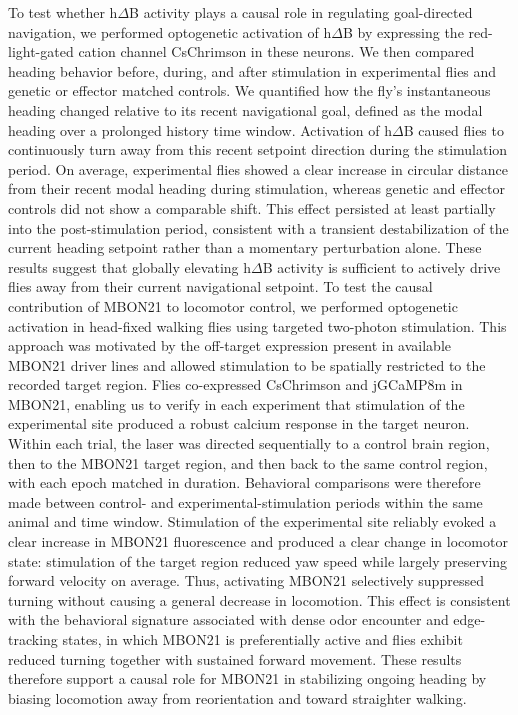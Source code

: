 To test whether h$\Delta$B activity plays a causal role in regulating goal-directed navigation, we performed optogenetic activation of h$\Delta$B by expressing the red-light-gated cation channel CsChrimson in these neurons. We then compared heading behavior before, during, and after stimulation in experimental flies and genetic or effector matched controls. We quantified how the fly’s instantaneous heading changed relative to its recent navigational goal, defined as the modal heading over a prolonged history time window.
Activation of h$\Delta$B caused flies to continuously turn away from this recent setpoint direction during the stimulation period. On average, experimental flies showed a clear increase in circular distance from their recent modal heading during stimulation, whereas genetic and effector controls did not show a comparable shift. This effect persisted at least partially into the post-stimulation period, consistent with a transient destabilization of the current heading setpoint rather than a momentary perturbation alone. These results suggest that globally elevating h$\Delta$B activity is sufficient to actively drive flies away from their current navigational setpoint. 
To test the causal contribution of MBON21 to locomotor control, we performed optogenetic activation in head-fixed walking flies using targeted two-photon stimulation. This approach was motivated by the off-target expression present in available MBON21 driver lines and allowed stimulation to be spatially restricted to the recorded target region. Flies co-expressed CsChrimson and jGCaMP8m in MBON21, enabling us to verify in each experiment that stimulation of the experimental site produced a robust calcium response in the target neuron. Within each trial, the laser was directed sequentially to a control brain region, then to the MBON21 target region, and then back to the same control region, with each epoch matched in duration. Behavioral comparisons were therefore made between control- and experimental-stimulation periods within the same animal and time window.
Stimulation of the experimental site reliably evoked a clear increase in MBON21 fluorescence and produced a clear change in locomotor state: stimulation of the target region reduced yaw speed while largely preserving forward velocity on average. Thus, activating MBON21 selectively suppressed turning without causing a general decrease in locomotion. This effect is consistent with the behavioral signature associated with dense odor encounter and edge-tracking states, in which MBON21 is preferentially active and flies exhibit reduced turning together with sustained forward movement. These results therefore support a causal role for MBON21 in stabilizing ongoing heading by biasing locomotion away from reorientation and toward straighter walking.
